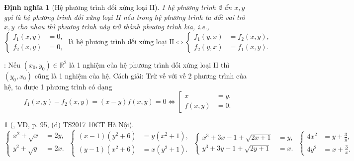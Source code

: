 \documentclass{article}
\newtheorem{baitoan}{}
\newtheorem{dinhnghia}{Định nghĩa}
\begin{document}
\begin{dinhnghia}[Hệ phương trình đối xứng loại II]
	1 hệ phương trình 2 ẩn $x,y$ gọi là {hệ phương trình đối xứng loại II} nếu trong hệ phương trình ta đổi vai trò $x,y$ cho nhau thì phương trình này trở thành phương trình kia, i.e.,
	\begin{equation*}
		\left\{\begin{split}
			f_1(x,y) &= 0,\\
			f_2(x,y) &= 0,
		\end{split}\right.\mbox{ là hệ phương trình đối xứng loại II}\Leftrightarrow\left\{\begin{split}
			f_1(y,x) &= f_2(x,y),\\
			f_2(y,x) &= f_1(x,y).
		\end{split}\right.
	\end{equation*}
\end{dinhnghia}
: Nếu $(x_0,y_0)\in\mathbb{R}^2$ là 1 nghiệm của hệ phương trình đối xứng loại II thì $(y_0,x_0)$ cũng là 1 nghiệm của hệ. {\sf Cách giải}: Trừ vế với vế 2 phương trình của hệ, ta được 1 phương trình có dạng
\begin{equation*}
	f_1(x,y) - f_2(x,y) = (x - y)f(x,y) = 0\Leftrightarrow\left[\begin{split}
		x &= y,\\
		f(x,y) &= 0.
	\end{split}\right.
\end{equation*}

\begin{baitoan}[\cite{Kien_dai_so_9}, VD, p. 95, (d) TS2017 10CT Hà Nội]
	\begin{equation*}
		\left\{\begin{split}
			x^2 + \sqrt{x} &= 2y,\\
			y^2 + \sqrt{y} &= 2x.
		\end{split}\right.\ \left\{\begin{split}
			(x - 1)(y^2 + 6) &= y(x^2 + 1),\\
			(y - 1)(x^2 + 6) &= x(y^2 + 1).
		\end{split}\right.\ \left\{\begin{split}
			x^3 + 3x - 1 + \sqrt{2x + 1} &= y,\\
			y^3 + 3y - 1 + \sqrt{2y + 1} &= x.
		\end{split}\right.\ \left\{\begin{split}
			4x^2 &= y + \frac{3}{y},\\
			4y^2 &= x + \frac{3}{x}.
		\end{split}\right.
	\end{equation*}
\end{baitoan}
\end{document}
